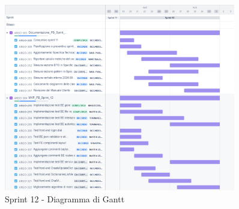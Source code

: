 \begin{figure}[H]
  \centering
  \includegraphics[width=0.90\textwidth]{assets/Pianificazione/Sprint-12/gantt.png}
  \caption{Sprint 12 - Diagramma di Gantt}\label{fig:sprint-12-gantt}
\end{figure}

